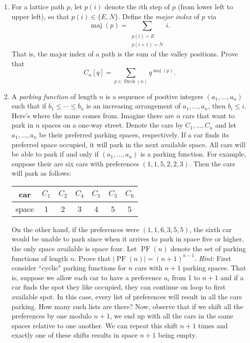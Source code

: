 \documentclass[11pt]{article}
\theoremstyle{definition}
\DeclareMathOperator{\Dyck}{Dyck}
\DeclareMathOperator{\maj}{maj}
\DeclareMathOperator{\PF}{PF}
\begin{document}
\begin{enumerate}
\item For a lattice path $p$, let $p(i)$ denote the $i$th step of $p$ (from lower left to upper left), so that $p(i)\in\{E,N\}$. Define the \emph{major index} of $p$ via
\[
\maj(p)=\sum_{\substack{p(i)=E \\ p(i+1)=N}}i.
\]
That is, the major index of a path is the sum of the valley positions.  Prove that
\[
C_n[q]=\sum_{p\in\Dyck(n)}q^{\maj(p)}.
\]

\item A \emph{parking function} of length $n$ is a sequence of positive integers $(a_1,\ldots,a_n)$ such that if $b_1\leq \cdots \leq b_n$ is an increasing arrangement of $a_1,\ldots, a_n$, then $b_i\leq i$.  Here's where the name comes from.  Imagine there are $n$ cars that want to park in $n$ spaces on a one-way street.  Denote the cars by $C_1,\ldots, C_n$ and let $a_1,\ldots,a_n$ be their preferred parking spaces, respectively. If a car finds its preferred space occupied, it will park in the next available space.  All cars will be able to park if and only if $(a_1,\ldots,a_n)$ is a parking function.  For example, suppose their are six cars with preferences $(1,1,5,2,2,3)$.  Then the cars will park as follows:
\begin{center}
\begin{tabular}{c|cccccc}
car & $C_1$ & $C_2$ & $C_4$ & $C_5$ & $C_3$ & $C_6$\\
\hline
space & 1 & 2 & 3 & 4 & 5 & 5
\end{tabular}
\end{center}

On the other hand, if the preferences were $(1,1,6,3,5,5)$, the sixth car would be unable to park since when it arrives to park in space five or higher, the only space available is space four. Let $\PF(n)$ denote the set of parking functions of length $n$.  Prove that $|\PF(n)|=(n+1)^{n-1}$. \emph{Hint:} First consider ``cyclic" parking functions for $n$ cars with $n+1$ parking spaces.  That is, suppose we allow each car to have a preference $a_i$ from 1 to $n+1$ and if a car finds the spot they like occupied, they can continue on loop to first available spot.  In this case, every list of preferences will result in all the cars parking.  How many such lists are there?  Now, observe that if we shift all the preferences by one modulo $n+1$, we end up with all the cars in the same spaces relative to one another. We can repeat this shift $n+1$ times and exactly one of these shifts results in space $n+1$ being empty.

\end{enumerate}
\end{document}
